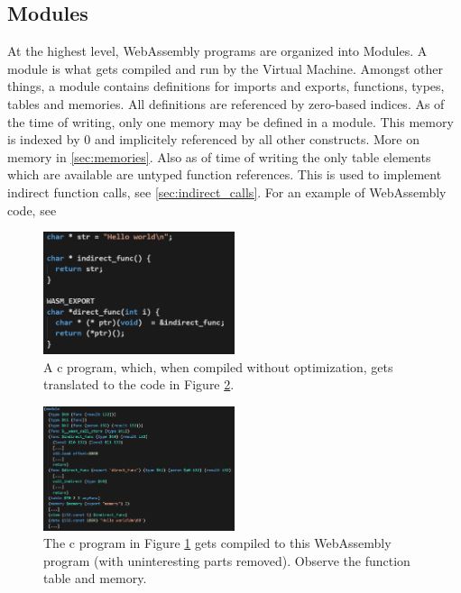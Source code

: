 \documentclass[sigconf]{acmart}
\begin{document}
\subsection{Modules}
At the highest level, WebAssembly programs are organized into Modules.  A module is what gets compiled and run by the Virtual Machine. Amongst other things, a module contains definitions for imports and exports, functions, types, tables and memories. All definitions are referenced by zero-based indices. As of the time of writing, only one memory may be defined in a module. This memory is indexed by 0 and implicitely referenced by all other constructs. More on memory in \ref{sec:memories}. Also as of time of writing the only table elements which are available are untyped function references. This is used to implement indirect function calls, see \ref{sec:indirect_calls}. For an example of WebAssembly code, see 

\begin{figure}[h]
  \centering
  \includegraphics[width=0.5\textwidth]{wasm_example_c}
  \caption{A c program, which, when compiled without optimization, gets translated to the code in Figure  \ref{fig:wasm_example_wasm}.}
\label{fig:wasm_example_c}
\end{figure}

\begin{figure}[h]
  \centering
  \includegraphics[width=0.5\textwidth]{wasm_example_wasm}
  \caption{The c program in Figure \ref{fig:wasm_example_c} gets compiled to this WebAssembly program (with uninteresting parts removed). Observe the function table and memory.}  
\label{fig:wasm_example_wasm}
\end{figure}
\end{document}
